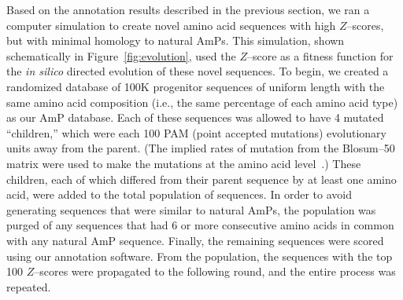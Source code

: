     Based on the annotation results described in the previous
    section,
    we ran a computer simulation to create novel amino acid sequences
    with high $Z$--scores, but with minimal homology to natural AmPs.
    This simulation, shown schematically in Figure~\vref{fig:evolution},
    used the $Z$--score as a fitness function for the \emph{in
    silico} directed evolution of these novel sequences.  To begin,
    we created a randomized database of 100K progenitor sequences
    of uniform length with the same amino acid composition (i.e.,
    the same percentage of each amino acid type) as our AmP database.
    Each of these sequences was allowed to have 4 mutated ``children,''
    which were each 100 PAM (point accepted mutations) evolutionary
    units away from the parent.  (The implied rates of mutation from
    the Blosum--50 matrix were used to make the mutations at the amino
    acid level~\cite{henikoff1992aminoacid}.)  These children, each
    of which differed from their parent sequence by at least one amino
    acid, were added to the total population of sequences.  In order to
    avoid generating sequences that were similar to natural AmPs, the
    population was purged of any sequences that had 6 or more consecutive
    amino acids in common with any natural AmP sequence.  Finally,
    the remaining sequences were scored using our annotation software.
    From the population, the sequences with the top 100 $Z$--scores
    were propagated to the following round, and the entire process was
    repeated.


